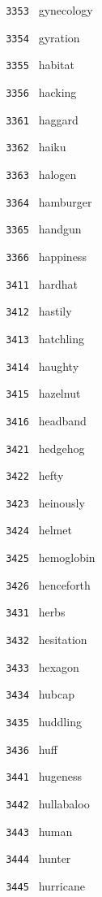 \documentclass[11pt]{article}
\begin{document}
\begin{multicols}{6}
\noindent \texttt{ 3353 } gynecology  \par
\noindent \texttt{ 3354 } gyration  \par
\noindent \texttt{ 3355 } habitat  \par
\noindent \texttt{ 3356 } hacking  \par
\noindent \texttt{ 3361 } haggard  \par
\noindent \texttt{ 3362 } haiku  \par
\noindent \texttt{ 3363 } halogen  \par
\noindent \texttt{ 3364 } hamburger  \par
\noindent \texttt{ 3365 } handgun  \par
\noindent \texttt{ 3366 } happiness  \par
\noindent \texttt{ 3411 } hardhat  \par
\noindent \texttt{ 3412 } hastily  \par
\noindent \texttt{ 3413 } hatchling  \par
\noindent \texttt{ 3414 } haughty  \par
\noindent \texttt{ 3415 } hazelnut  \par
\noindent \texttt{ 3416 } headband  \par
\noindent \texttt{ 3421 } hedgehog  \par
\noindent \texttt{ 3422 } hefty  \par
\noindent \texttt{ 3423 } heinously  \par
\noindent \texttt{ 3424 } helmet  \par
\noindent \texttt{ 3425 } hemoglobin  \par
\noindent \texttt{ 3426 } henceforth  \par
\noindent \texttt{ 3431 } herbs  \par
\noindent \texttt{ 3432 } hesitation  \par
\noindent \texttt{ 3433 } hexagon  \par
\noindent \texttt{ 3434 } hubcap  \par
\noindent \texttt{ 3435 } huddling  \par
\noindent \texttt{ 3436 } huff  \par
\noindent \texttt{ 3441 } hugeness  \par
\noindent \texttt{ 3442 } hullabaloo  \par
\noindent \texttt{ 3443 } human  \par
\noindent \texttt{ 3444 } hunter  \par
\noindent \texttt{ 3445 } hurricane  \par

\end{multicols}
\end{document}
